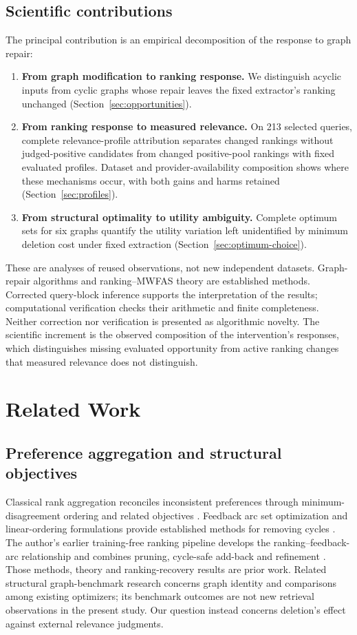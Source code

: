 \documentclass[pdflatex,iicol,sn-basic,Numbered]{sn-jnl}
\begin{document}
\subsection{Scientific contributions}
The principal contribution is an empirical decomposition of the response to graph repair:
\begin{enumerate}
\item \textbf{From graph modification to ranking response.} We distinguish acyclic inputs from cyclic graphs whose repair leaves the fixed extractor's ranking unchanged (Section~\ref{sec:opportunities}).
\item \textbf{From ranking response to measured relevance.} On 213 selected queries, complete relevance-profile attribution separates changed rankings without judged-positive candidates from changed positive-pool rankings with fixed evaluated profiles. Dataset and provider-availability composition shows where these mechanisms occur, with both gains and harms retained (Section~\ref{sec:profiles}).
\item \textbf{From structural optimality to utility ambiguity.} Complete optimum sets for six graphs quantify the utility variation left unidentified by minimum deletion cost under fixed extraction (Section~\ref{sec:optimum-choice}).
\end{enumerate}
These are analyses of reused observations, not new independent datasets. Graph-repair algorithms and ranking--MWFAS theory are established methods. Corrected query-block inference supports the interpretation of the results; computational verification checks their arithmetic and finite completeness. Neither correction nor verification is presented as algorithmic novelty. The scientific increment is the observed composition of the intervention's responses, which distinguishes missing evaluated opportunity from active ranking changes that measured relevance does not distinguish.

\section{Related Work}\label{sec:related}
\subsection{Preference aggregation and structural objectives}
Classical rank aggregation reconciles inconsistent preferences through minimum-disagreement ordering and related objectives \cite{dwork2001rank,ailon2008aggregating}. Feedback arc set optimization and linear-ordering formulations provide established methods for removing cycles \cite{groetschel1984cutting,baharev2021exact}. The author's earlier training-free ranking pipeline develops the ranking--feedback-arc relationship and combines pruning, cycle-safe add-back and refinement \cite{vahidi2026acyclicranking}. Those methods, theory and ranking-recovery results are prior work. Related structural graph-benchmark research concerns graph identity and comparisons among existing optimizers; its benchmark outcomes are not new retrieval observations in the present study. Our question instead concerns deletion's effect against external relevance judgments.
\end{document}
